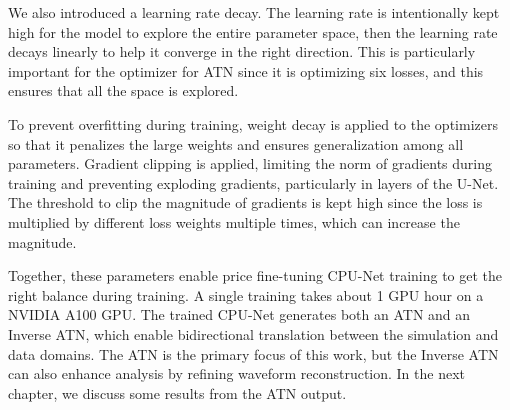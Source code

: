 We also introduced a learning rate decay. The learning rate is intentionally kept high for the model to explore the entire parameter space, then the learning rate decays linearly to help it converge in the right direction. This is particularly important for the optimizer for ATN since it is optimizing six losses, and this ensures that all the space is explored.

To prevent overfitting during training, weight decay is applied to the optimizers so that it penalizes the large weights and ensures generalization among all parameters. Gradient clipping is applied, limiting the norm of gradients during training and preventing exploding gradients, particularly in layers of the U-Net. The threshold to clip the magnitude of gradients is kept high since the loss is multiplied by different loss weights multiple times, which can increase the magnitude.

Together, these parameters enable price fine-tuning CPU-Net training to get the right balance during training. A single training takes about 1 GPU hour on a NVIDIA A100 GPU. The trained CPU-Net generates both an ATN and an Inverse ATN, which enable bidirectional translation between the simulation and data domains. The ATN is the primary focus of this work, but the Inverse ATN can also enhance analysis by refining waveform reconstruction. In the next chapter, we discuss some results from the ATN
output.